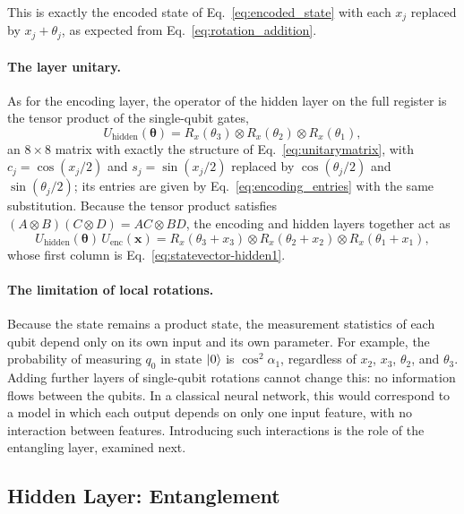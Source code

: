 \documentclass[12pt]{article}
\numberwithin{equation}{section}  %
\begin{document}
This is exactly the encoded state of Eq.~\eqref{eq:encoded_state} with each $x_j$ replaced by $x_j + \theta_j$, as expected from Eq.~\eqref{eq:rotation_addition}.

\paragraph{The layer unitary.} As for the encoding layer, the operator of the hidden layer on the full register is the tensor product of the single-qubit gates,
\begin{equation}
U_{\mathrm{hidden}}(\boldsymbol{\theta}) = R_x(\theta_3) \otimes R_x(\theta_2) \otimes R_x(\theta_1),
\end{equation}
an $8 \times 8$ matrix with exactly the structure of Eq.~\eqref{eq:unitarymatrix}, with $c_j = \cos(x_j/2)$ and $s_j = \sin(x_j/2)$ replaced by $\cos(\theta_j/2)$ and $\sin(\theta_j/2)$; its entries are given by Eq.~\eqref{eq:encoding_entries} with the same substitution. Because the tensor product satisfies $(A \otimes B)(C \otimes D) = AC \otimes BD$, the encoding and hidden layers together act as
\begin{equation}
U_{\mathrm{hidden}}(\boldsymbol{\theta})\, U_{\mathrm{enc}}(\mathbf{x})
= R_x(\theta_3 + x_3) \otimes R_x(\theta_2 + x_2) \otimes R_x(\theta_1 + x_1),
\end{equation}
whose first column is Eq.~\eqref{eq:statevector-hidden1}.

\paragraph{The limitation of local rotations.} Because the state remains a product state, the measurement statistics of each qubit depend only on its own input and its own parameter. For example, the probability of measuring $q_0$ in state $\ket{0}$ is $\cos^2\alpha_1$, regardless of $x_2$, $x_3$, $\theta_2$, and $\theta_3$. Adding further layers of single-qubit rotations cannot change this: no information flows between the qubits. In a classical neural network, this would correspond to a model in which each output depends on only one input feature, with no interaction between features. Introducing such interactions is the role of the entangling layer, examined next.

\subsection{Hidden Layer: Entanglement}
\label{sec:hidden_entanglement}
\end{document}
